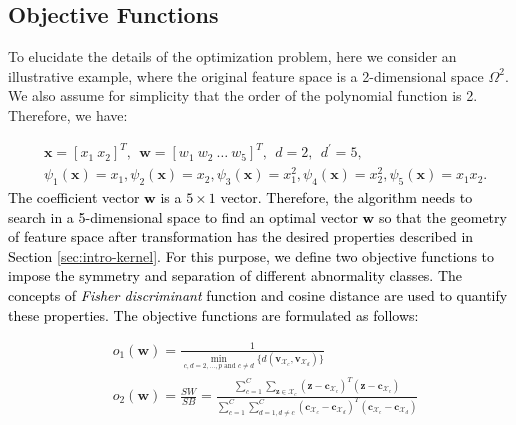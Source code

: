 \subsection{Objective Functions}

To elucidate the details of the optimization problem, here we consider an illustrative example, where the original feature space is a 2-dimensional space $\Omega^2$. %
We also assume for simplicity that the order of the polynomial function is 2. Therefore, we have:

\begin{align}
\nonumber
&\mathbf{x}=[x_1~ x_2]^T,~~ \mathbf{w}=[w_1~ w_2~ \dots~ w_5]^T,~~d=2, ~~d^\prime=5,\\
&\psi_1(\mathbf{x})=x_1, \psi_2(\mathbf{x})=x_2, \psi_3(\mathbf{x})=x_1^2, \psi_4(\mathbf{x})=x_2^2, \psi_5(\mathbf{x})=x_1x_2.
\label{eq5}
\end{align}
\textcolor{black}{The coefficient vector $\mathbf{w}$ is a $5 \times 1$ vector. Therefore, the algorithm needs to search in a 5-dimensional space to find an optimal vector $\mathbf{w}$ so that the geometry of feature space after transformation has the desired properties described in Section \ref{sec:intro-kernel}. For this purpose, we define two objective functions to impose the symmetry and separation of different abnormality classes. The concepts of \textit{Fisher discriminant} function and cosine distance are used to quantify these properties. The objective functions are formulated as follows:}


\begin{align}
\label{eq:obj}
&o_1(\mathbf{w}) = \frac{1}{\underset{c,d=2,\dots,p \text{ and } c\neq d }{\min}\{d(\mathbf{v}_{\mathcal{X}_c},\mathbf{v}_{\mathcal{X}_d})\}} \\ %
\nonumber 
&o_2(\mathbf{w}) = \frac{SW}{SB}=\frac{\sum_{c=1}^{C}  \sum_{\mathbf{z} \in \mathcal{X}_c}   (\mathbf{z}-\mathbf{c}_{\mathcal{X}_c})^T(\mathbf{z}-\mathbf{c}_{\mathcal{X}_c})}{\sum_{c=1}^{C}\sum_{d=1, d\neq c}^{C}  (\mathbf{c}_{\mathcal{X}_c}-\mathbf{c}_{\mathcal{X}_d})^T(\mathbf{c}_{\mathcal{X}_c}-\mathbf{c}_{\mathcal{X}_d}) }
\end{align}

